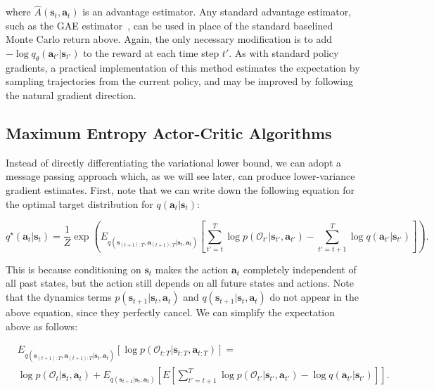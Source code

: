 where $\hat{A}(\mathbf{s}_t,\mathbf{a}_t)$ is an advantage estimator. Any standard advantage estimator, such as the GAE estimator~\citep{gae}, can be used in place of the standard baselined Monte Carlo return above. Again, the only necessary modification is to add $-\log q_\theta(\mathbf{a}_{t'}|\mathbf{s}_{t'})$ to the reward at each time step $t'$. As with standard policy gradients, a practical implementation of this method estimates the expectation by sampling trajectories from the current policy, and may be improved by following the natural gradient direction.

\subsection{Maximum Entropy Actor-Critic Algorithms}
\label{sec:maxentac}

Instead of directly differentiating the variational lower bound, we can adopt a message passing approach which, as we will see later, can produce lower-variance gradient estimates. First, note that we can write down the following equation for the optimal target distribution for $q(\mathbf{a}_t|\mathbf{s}_t)$:

\begin{equation*}
q^\star(\mathbf{a}_t|\mathbf{s}_t) = \frac{1}{Z}\exp \left(
E_{q(\mathbf{s}_{(t+1):T},\mathbf{a}_{(t+1):T}|\mathbf{s}_t,\mathbf{a}_t)} \left[ \sum_{t'=t}^T \log p(\mathcal{O}_{t'} | \mathbf{s}_{t'},\mathbf{a}_{t'}) - \sum_{t'=t+1}^T \log q(\mathbf{a}_{t'}|\mathbf{s}_{t'}) \right]
\right).
\end{equation*}

This is because conditioning on $\mathbf{s}_t$ makes the action $\mathbf{a}_t$ completely independent of all past states, but the action still depends on all future states and actions. Note that the dynamics terms $p(\mathbf{s}_{t+1}|\mathbf{s}_t,\mathbf{a}_t)$ and $q(\mathbf{s}_{t+1}|\mathbf{s}_t,\mathbf{a}_t)$ do not appear in the above equation, since they perfectly cancel. We can simplify the expectation above as follows:

\begin{align*}
&E_{q(\mathbf{s}_{(t+1):T},\mathbf{a}_{(t+1):T}|\mathbf{s}_t,\mathbf{a}_t)}[ \log p(\mathcal{O}_{t:T}|\mathbf{s}_{t:T},\mathbf{a}_{t:T}) ] = \\
&\log p(\mathcal{O}_t | \mathbf{s}_t,\mathbf{a}_t) +  E_{q(\mathbf{s}_{t+1} | \mathbf{s}_t, \mathbf{a}_t)}\left[ E \left[ \sum_{t'=t+1}^T \log p(\mathcal{O}_{t'} | \mathbf{s}_{t'},\mathbf{a}_{t'}) - \log q(\mathbf{a}_{t'}|\mathbf{s}_{t'}) \right] \right].
\end{align*}

